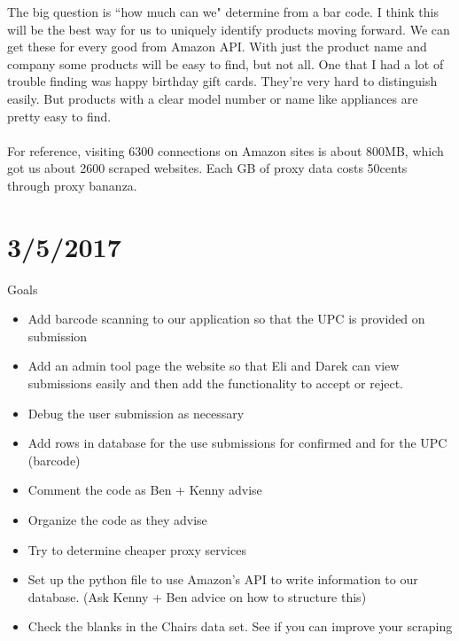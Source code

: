 \documentclass[12pt]{article}
\begin{document}
The big question is ``how much can we" determine from a bar code. I think this will be the best way for us to uniquely identify products moving forward. We can get these for every good from Amazon API. With just the product name and company some products will be easy to find, but not all. One that I had a lot of trouble finding was happy birthday gift cards. They're very hard to distinguish easily. But products with a clear model number or name like appliances are pretty easy to find.  \\ \\

For reference, visiting 6300 connections on Amazon sites is about 800MB, which got us about 2600 scraped websites. Each GB of proxy data costs 50cents through proxy bananza.

\section*{3/5/2017}
Goals

\begin{itemize}
	\item Add barcode scanning to our application so that the UPC is provided on submission
	\item Add an admin tool page the website so that Eli and Darek can view submissions easily and then add the functionality to accept or reject.
	\item Debug the user submission as necessary
	\item Add rows in database for the use submissions for confirmed and for the UPC (barcode)
	\item Comment the code as Ben + Kenny advise
	\item Organize the code as they advise
	\item Try to determine cheaper proxy services
	\item Set up the python file to use Amazon's API to write information to our database. (Ask Kenny + Ben advice on how to structure this)
	\item Check the blanks in the Chairs data set. See if you can improve your scraping
\end{itemize}
\end{document}
